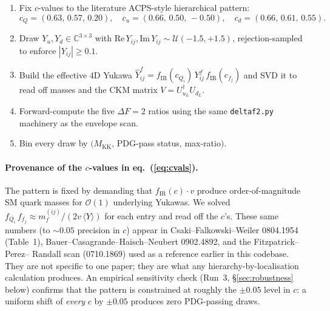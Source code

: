 \documentclass[11pt]{article}
\newcommand{\Mkk}{M_{\mathrm{KK}}}
\newcommand{\fIR}{f_{\mathrm{IR}}}
\newcommand{\Yu}{Y_u}
\newcommand{\Yd}{Y_d}
\begin{document}
\begin{enumerate}[leftmargin=2em,itemsep=2pt]
  \item Fix $c$-values to the literature ACPS-style hierarchical pattern:
        \begin{equation}
          c_Q = (0.63,\,0.57,\,0.20),\quad
          c_u = (0.66,\,0.50,\,-0.50),\quad
          c_d = (0.66,\,0.61,\,0.55).
          \label{eq:cvals}
        \end{equation}
  \item Draw $\Yu,\Yd \in \mathbb{C}^{3\times 3}$ with
        $\mathrm{Re}\,Y_{ij},\mathrm{Im}\,Y_{ij}\sim\mathcal{U}(-1.5,+1.5)$,
        rejection-sampled to enforce $|Y_{ij}|\ge 0.1$.
  \item Build the effective 4D Yukawa
        $\hat Y^{f}_{ij} = \fIR(c_{Q_i})\,Y^{f}_{ij}\,\fIR(c_{f_j})$ and
        SVD it to read off masses and the CKM matrix
        $V = U_{u_L}^{\dagger}U_{d_L}$.
  \item Forward-compute the five $\Delta F = 2$ ratios using the same
        \texttt{deltaf2.py} machinery as the envelope scan.
  \item Bin every draw by $(\Mkk,\,$PDG-pass status$,\,$max-ratio$)$.
\end{enumerate}

\paragraph{Provenance of the $c$-values in eq.~(\ref{eq:cvals}).}
The pattern is fixed by demanding that $\fIR(c)\cdot v$ produce
order-of-magnitude SM quark masses for $\mathcal{O}(1)$ underlying
Yukawas. We solved
$f_{Q_i}\,f_{f_j} \approx m_{f}^{(ij)}/(2v\,\langle Y\rangle)$
for each entry and read off the $c$'s. These same numbers (to $\sim\!0.05$
precision in $c$) appear in Csaki--Falkowski--Weiler 0804.1954 (Table~1),
Bauer--Casagrande--Haisch--Neubert 0902.4892, and the Fitzpatrick--Perez--
Randall scan (0710.1869) used as a reference earlier in this codebase.
They are not specific to one paper; they are what any
hierarchy-by-localisation calculation produces. An empirical sensitivity
check (Run~3, \S\ref{sec:robustness} below) confirms that the pattern is
constrained at roughly the $\pm 0.05$ level in $c$: a uniform shift of
\emph{every} $c$ by $\pm 0.05$ produces zero PDG-passing draws.
\end{document}
